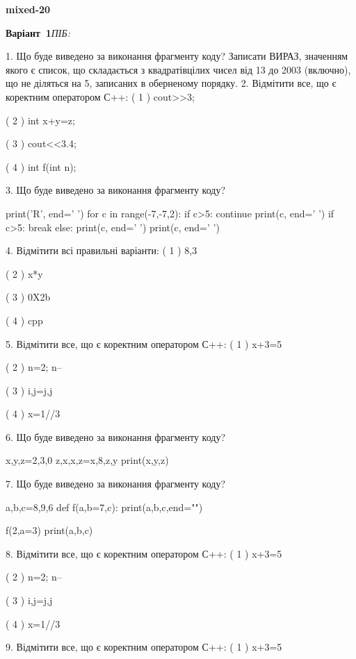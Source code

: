 \documentclass[11pt]{article}
\begin{document}
{\large\textbf{mixed-20}}

\textbf{Варіант \No\,1}\hfill \textit{ПІБ:}\,\underline{\hspace{60mm}}
\vspace{4mm}

1. Що буде виведено за виконання фрагменту коду?
Записати ВИРАЗ, значенням якого є список, що складається з квадратівцілих чисел від 13 до 2003 (включно), що не діляться на 5, записаних в оберненому порядку.
2. Відмітити все, що є коректним оператором С++:
( 1 ) cout>>3;

( 2 ) int x+y=z;

( 3 ) cout<<3.4;

( 4 ) int f(int n);

3. Що буде виведено за виконання фрагменту коду?

print('R', end=' ')
for c in range(-7,-7,2):
    if c>5:
        continue
        print(c, end=' ')
    if c>5:
        break
    else:
        print(c, end=' ')
    print(c, end=' ')

4. Відмітити всі правильні варіанти:
( 1 ) 8,3

( 2 ) x*y

( 3 ) 0X2b

( 4 ) cpp

5. Відмітити все, що є коректним оператором С++:
( 1 ) x+3=5

( 2 ) n=2; n--

( 3 ) i,j=j,j

( 4 ) x=1//3

6. Що буде виведено за виконання фрагменту коду?

x,y,z=2,3,0
z,x,x,z=x,8,z,y
print(x,y,z)

7. Що буде виведено за виконання фрагменту коду?

a,b,c=8,9,6
def f(a,b=7,c):
    print(a,b,c,end="")

f(2,a=3)
print(a,b,c)


8. Відмітити все, що є коректним оператором С++:
( 1 ) x+3=5

( 2 ) n=2; n--

( 3 ) i,j=j,j

( 4 ) x=1//3

9. Відмітити все, що є коректним оператором С++:
( 1 ) x+3=5
\end{document}
